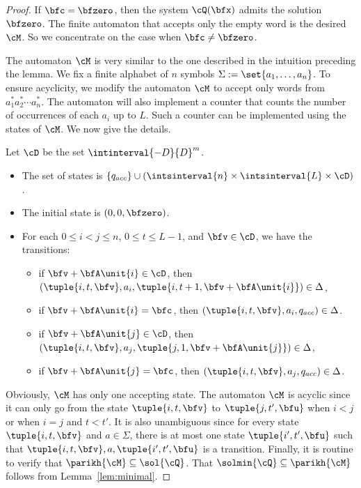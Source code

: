 \begin{proof}
If $\bfc = \bfzero$, then the system $\cQ(\bfx)$ admits the
solution $\bfzero$.
The finite automaton that accepts only the empty word is the desired $\cM$.
So we concentrate on the case when $\bfc\neq \bfzero$.

The automaton $\cM$ is very similar to the one described in the intuition preceding the lemma.
We fix a finite alphabet of $n$ symbols $\Sigma := \set{a_1, \ldots, a_{n}}$.
To ensure acyclicity, we modify the automaton $\cM$ to accept only words from $a_1^*a_2^*\cdots a_n^*$. The automaton will also implement a counter that counts the number of occurrences of each $a_i$ up to $L$. Such a counter can be implemented using the states of $\cM$.
We now give the details.

Let $\cD$ be the set $\intinterval{-D}{D}^{m}$.
\begin{itemize}
\item 
The set of states is 
$\{q_{acc}\}\cup(\intsinterval{n}\times\intsinterval{L} \times \cD)$.
\item
The initial state is $(0,0,\bfzero)$.
\item 
For each $0\leq i<j \leq n$, $0\leq t\leq L-1$,
and $\bfv \in \cD$,
we have the transitions:
\begin{itemize}
\item 
if $\bfv + \bfA\unit{i} \in \cD$,
then $(\tuple{i,t, \bfv}, a_i, \tuple{i,t+1, \bfv + \bfA\unit{i}}) \in \Delta$, 
\item 
if $\bfv + \bfA\unit{i}  = \bfc$,
then $(\tuple{i, t,\bfv}, a_i, q_{acc}) \in \Delta$.

\item 
if $\bfv + \bfA\unit{j} \in \cD$,
then $(\tuple{i,t, \bfv}, a_j, \tuple{j,1, \bfv + \bfA\unit{j}}) \in \Delta$, 
\item 
if $\bfv + \bfA\unit{j}  = \bfc$,
then $(\tuple{i, t,\bfv}, a_j, q_{acc}) \in \Delta$.
\end{itemize}
\end{itemize}
Obviously, $\cM$ has only one accepting state.
The automaton $\cM$ is acyclic since it can only go from the state
$\tuple{i,t, \bfv}$ to $\tuple{j,t',\bfu}$
when $i< j$ or when $i=j$ and $t<t'$.
It is also unambiguous since
for every state $\tuple{i,t,\bfv}$ and $a\in \Sigma$, there is at most one state $\tuple{i',t',\bfu}$
such that $\tuple{i,t,\bfv},a,\tuple{i',t',\bfu}$ is a transition.
Finally, it is routine to verify that
$\parikh{\cM}\subseteq \sol{\cQ}$.
That $\solmin{\cQ}\subseteq \parikh{\cM}$
follows from Lemma~\ref{lem:minimal}.
\end{proof}

